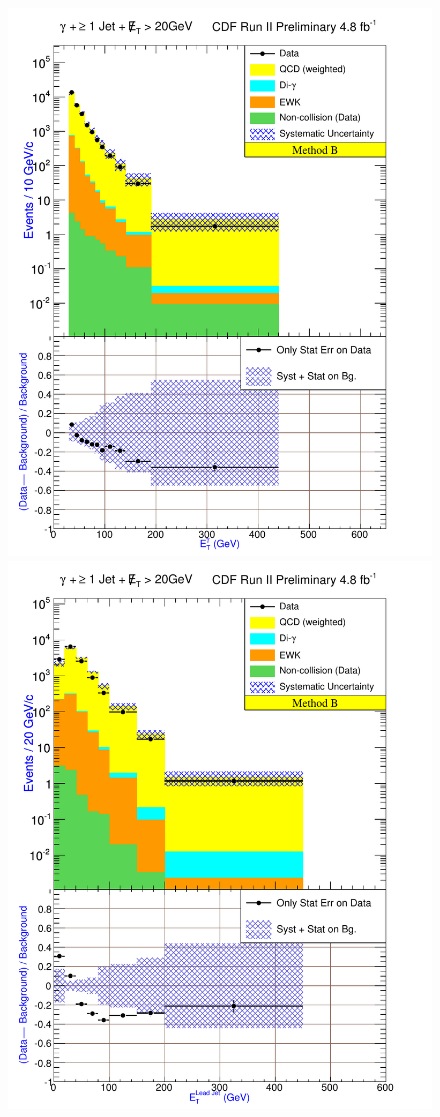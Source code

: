 \begin{figure}[h!]
 \centering
{\includegraphics[keepaspectratio=true, scale=\resultsHistScale]{G30JetsMet20_MtdB_plot1_Et_pho.pdf}}
{\includegraphics[keepaspectratio=true, scale=\resultsHistScale]{G30JetsMet20_MtdB_plot1_Et_j1.pdf}}

\end{figure}

